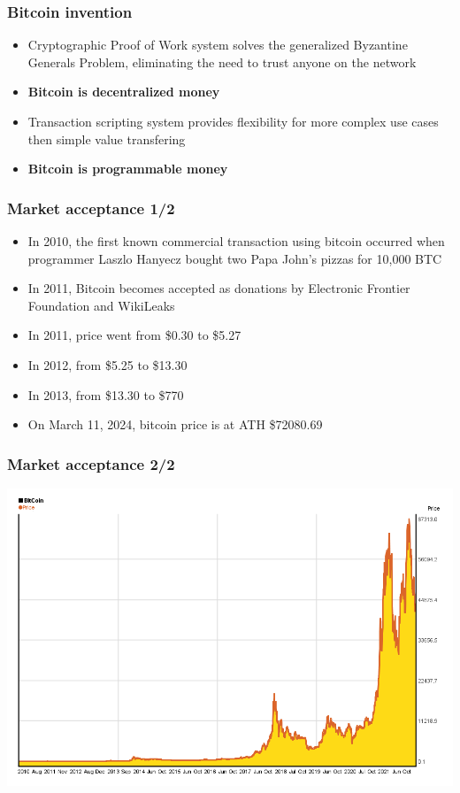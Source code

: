 \documentclass{beamer}
\begin{document}
\begin{frame}
  \frametitle{Bitcoin invention}
  \begin{itemize}
  \item Cryptographic Proof of Work system solves the generalized Byzantine
    Generals Problem, eliminating the need to trust anyone on the network
  \item \textbf{Bitcoin is decentralized money}
  \item Transaction scripting system provides flexibility for more complex use
    cases then simple value transfering
  \item \textbf{Bitcoin is programmable money}
  \end{itemize}
\end{frame}

\begin{frame}
  \frametitle{Market acceptance 1/2}
  \begin{itemize}
  \item In 2010, the first known commercial transaction using bitcoin occurred
    when programmer Laszlo Hanyecz bought two Papa John's pizzas for 10,000 BTC
  \item In 2011, Bitcoin becomes accepted as donations by Electronic Frontier
    Foundation and WikiLeaks
  \item In 2011, price went from \$0.30 to \$5.27
  \item In 2012, from \$5.25 to \$13.30
  \item In 2013, from \$13.30 to \$770
  \item On March 11, 2024, bitcoin price is at ATH \$72080.69
  \end{itemize}
\end{frame}

\begin{frame}[fragile]
  \frametitle{Market acceptance 2/2}
  \includegraphics[width=\textwidth]{bitcoin-price}
\end{frame}
\end{document}
